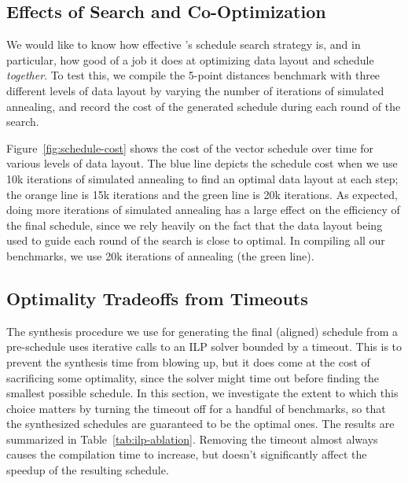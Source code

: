 \subsection{Effects of Search and Co-Optimization}\label{sec:search-and-cooptimization}
We would like to know how effective \system's schedule search strategy is, and in particular, how good of a job it does at optimizing data layout and schedule {\em together}.
To test this, we compile the 5-point distances benchmark with three different levels of data layout by varying the number of iterations of simulated annealing, and record the cost of the generated schedule during each round of the search.

Figure~\ref{fig:schedule-cost} shows the cost of the vector schedule over time for various levels of data layout.
The blue line depicts the schedule cost when we use 10k iterations of simulated annealing to find an optimal data layout at each step; the orange line is 15k iterations and the green line is 20k iterations.
As expected, doing more iterations of simulated annealing has a large effect on the efficiency of the final schedule, since we rely heavily on the fact that the data layout being used to guide each round of the search is close to optimal.
In compiling all our benchmarks, we use 20k iterations of annealing (the green line).

\subsection{Optimality Tradeoffs from Timeouts}\label{sec:ilp-ablation}
The synthesis procedure we use for generating the final (aligned) schedule from a pre-schedule uses iterative calls to an ILP solver bounded by a timeout.
This is to prevent the synthesis time from blowing up, but it does come at the cost of sacrificing some optimality, since the solver might time out before finding the smallest possible schedule. 
In this section, we investigate the extent to which this choice matters by turning the timeout off for a handful of benchmarks, so that the synthesized schedules are guaranteed to be the optimal ones. 
The results are summarized in Table~\ref{tab:ilp-ablation}. 
Removing the timeout almost always causes the compilation time to increase, but doesn't significantly affect the speedup of the resulting schedule. 

